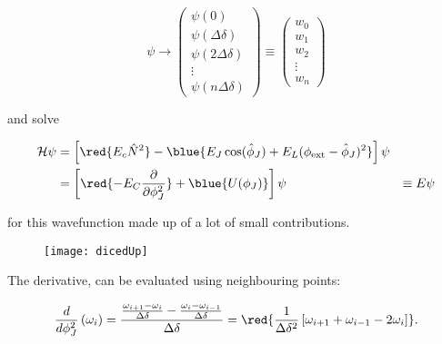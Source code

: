 \[
  \psi \rightarrow \begin{pmatrix}
    \psi(0)\\
    \psi(\Delta \delta)\\
    \psi(2\Delta \delta)\\\vdots
    \\
    \psi(n\Delta \delta)
  \end{pmatrix}
  \equiv
  \begin{pmatrix}
    w_0\\
    w_1\\
    w_2\\
    \vdots\\
    w_{n}
  \end{pmatrix}
\]

\noindent and solve

\begin{equation}\label{eqn:flux_1}
  \begin{aligned}
    \mathcal{H}     \psi     &      =     \left[\red{E_c\hat{N}^2}     -
      \blue{E_J\cos(\hat{\phi}_J) +
        E_L(\phi_\text{ext}-\hat{\phi}_J)^2} \right]\psi\\
    &       =      \left[\red{-E_C\frac{\partial}{\partial\phi_J^2}}       +
      \blue{U(\phi_J)}\right]\psi &\equiv E\psi
  \end{aligned}
\end{equation}

\noindent  for  this   wavefunction  made  up  of  a   lot  of  small
contributions.

\begin{figure}[h]
  \centering \texttt{[image: dicedUp]}
\end{figure}

\noindent

\noindent The derivative, can be evaluated using neighbouring points:

   \begin{equation}\label{eqn:flux_2}
     \frac{d}{d\phi_J^2}\left(\omega_i\right) = \frac{\frac{\omega_{i+1} - \omega_i}{\Delta\delta} - \frac{\omega_{i} - \omega_{i-1}}{\Delta\delta}}{\Delta\delta} = \red{\frac{1}{\Delta\delta^2}\left[\omega_{i+1}+\omega_{i-1}-2\omega_{i}\right]}.
   \end{equation}

